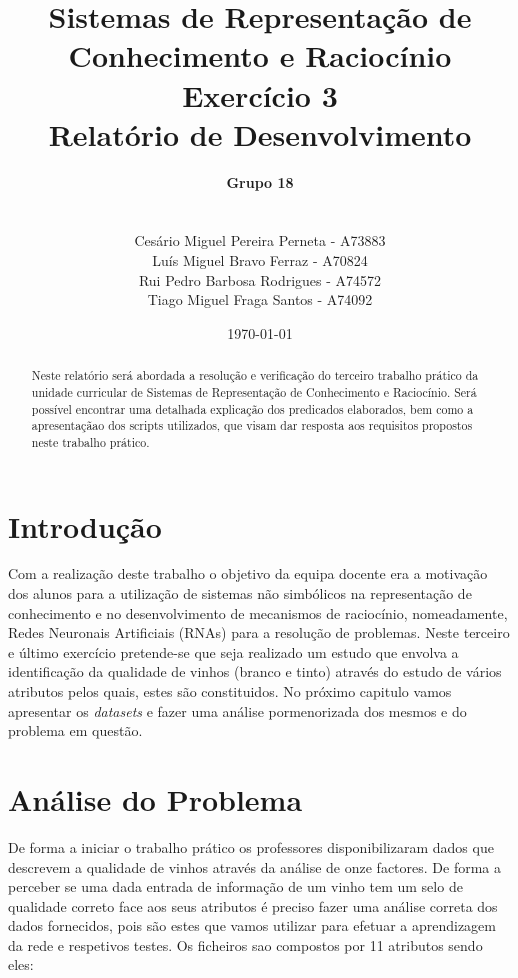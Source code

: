 \documentclass{report}
\title{Sistemas de Representação de Conhecimento e Raciocínio\\ \textbf{Exercício 3}\\ Relatório de Desenvolvimento}
\author{\textbf{Grupo 18}\\
\\
\\
Cesário Miguel Pereira Perneta - A73883
\\
Luís Miguel Bravo Ferraz - A70824
\\
Rui Pedro Barbosa Rodrigues - A74572
\\
Tiago Miguel Fraga Santos - A74092}
\date{\today}
\begin{document}
 
 
\maketitle
 
\begin{abstract}
Neste relatório será abordada a resolução e verificação do terceiro trabalho prático da unidade curricular de Sistemas de Representação de Conhecimento e Raciocínio.
Será possível encontrar uma detalhada explicação dos predicados elaborados, bem como a apresentaçãao dos scripts utilizados, que visam dar resposta aos requisitos propostos neste trabalho prático.
\end{abstract}
 
\tableofcontents

\chapter{Introdução} \label{intro}

Com a realização deste trabalho o objetivo da equipa docente era a motivação dos alunos para a utilização de sistemas não simbólicos na representação de conhecimento e no desenvolvimento de mecanismos de raciocínio, nomeadamente, Redes Neuronais Artificiais (RNAs) para a resolução de problemas.
Neste terceiro e último exercício pretende-se que seja realizado um estudo que envolva a identificação da qualidade de vinhos (branco e tinto) através do estudo de vários atributos pelos quais, estes são constituidos. 
No próximo capitulo vamos apresentar os \textit{datasets} e fazer uma análise pormenorizada dos mesmos e do problema em questão.


\chapter{Análise do Problema}

De forma a iniciar o trabalho prático os professores disponibilizaram dados que descrevem a qualidade de vinhos através da análise de onze factores. De forma a perceber se uma dada entrada de informação de um vinho tem um selo de qualidade correto face aos seus atributos é preciso fazer uma análise correta dos dados fornecidos, pois são estes que vamos utilizar para efetuar a aprendizagem da rede e respetivos testes. Os ficheiros sao compostos por 11 atributos sendo eles:
\end{document}
